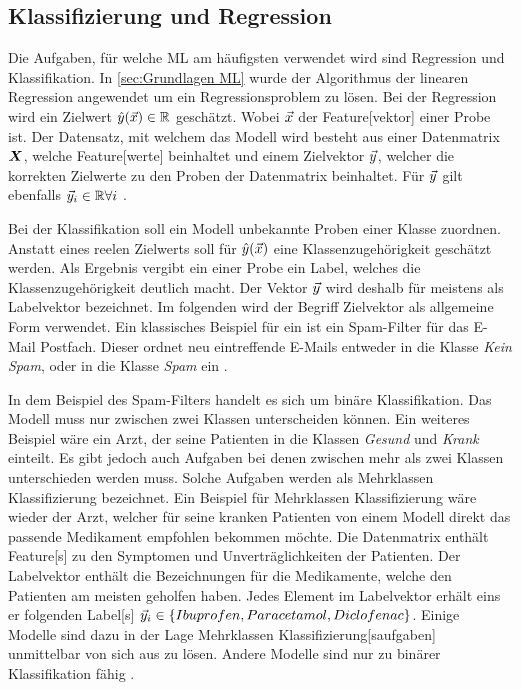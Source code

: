 \subsection{Klassifizierung und Regression}
Die Aufgaben, für welche \gls{ML} am häufigsten verwendet wird sind Regression und \gls{Klassifikation}. In \ref{sec:Grundlagen ML} wurde der Algorithmus der linearen Regression angewendet um ein Regressionsproblem zu lösen. Bei der Regression wird ein Zielwert \(\hat{y}(\vec{x}) \in \mathbb{R}\) geschätzt. Wobei \(\vec{x}\) der \gls{Feature}[vektor] einer Probe ist. Der Datensatz, mit welchem das Modell  wird besteht aus einer \gls{Datenmatrix} \(\boldsymbol{X}\), welche \gls{Feature}[werte] beinhaltet und einem \gls{Zielvektor} \(\vec{y}\), welcher die korrekten Zielwerte zu den Proben der \gls{Datenmatrix} beinhaltet. Für \(\vec{y}\) gilt ebenfalls \(\vec{y}_i \in \mathbb{R} \forall i \) \cite{Burkov.2019, ShalevShwartz.2014}. \par

Bei der \gls{Klassifikation} soll ein Modell unbekannte Proben einer Klasse zuordnen. Anstatt eines reelen Zielwerts soll für \(\hat{y}(\vec{x})\) eine Klassenzugehörigkeit geschätzt werden. Als Ergebnis vergibt ein  einer Probe ein \gls{Label}, welches die Klassenzugehörigkeit deutlich macht. Der Vektor \(\vec{y}\) wird deshalb für  meistens als \gls{Labelvektor} bezeichnet. Im folgenden wird der Begriff \gls{Zielvektor} als allgemeine Form verwendet. Ein klassisches Beispiel für ein  ist ein Spam-Filter für das E-Mail Postfach. Dieser ordnet neu eintreffende E-Mails entweder in die Klasse \textit{Kein Spam}, oder in die Klasse \textit{Spam} ein \cite{Burkov.2019}. \par

In dem Beispiel des Spam-Filters handelt es sich um binäre \gls{Klassifikation}. Das Modell muss nur zwischen zwei Klassen unterscheiden können. Ein weiteres Beispiel wäre ein Arzt, der seine Patienten in die Klassen \textit{Gesund} und \textit{Krank} einteilt. Es gibt jedoch auch Aufgaben bei denen zwischen mehr als zwei Klassen unterschieden werden muss. Solche Aufgaben werden als \gls{Mehrklassen Klassifizierung} bezeichnet. Ein Beispiel für \gls{Mehrklassen Klassifizierung} wäre wieder der Arzt, welcher für seine kranken Patienten von einem Modell direkt das passende Medikament empfohlen bekommen möchte. Die \gls{Datenmatrix} enthält \gls{Feature}[s] zu den Symptomen und Unverträglichkeiten der Patienten. Der \gls{Labelvektor} enthält die Bezeichnungen für die Medikamente, welche den Patienten am meisten geholfen haben. Jedes Element im \gls{Labelvektor} erhält eins er folgenden \gls{Label}[s] \(\vec{y}_i \in \{Ibuprofen, Paracetamol, Diclofenac\}\). Einige Modelle sind dazu in der Lage \gls{Mehrklassen Klassifizierung}[saufgaben] unmittelbar von sich aus zu lösen. Andere Modelle sind nur zu binärer \gls{Klassifikation} fähig \cite{Burkov.2019}.\par

